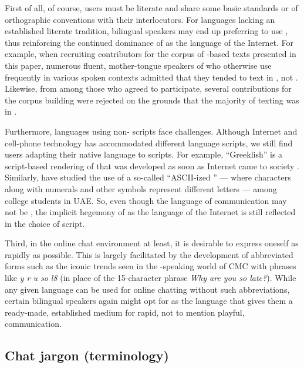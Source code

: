 \documentclass[output=paper
,newtxmath
,modfonts
,nonflat]{langsci/langscibook}
\begin{document}
First of all, of course, users must be literate and share some basic standards or  of orthographic conventions with their interlocutors. For languages lacking an established literate tradition, bilingual speakers may end up preferring to use , thus reinforcing the continued dominance of  as the language of the Internet. For example, when recruiting contributors for the corpus of -based texts presented in this paper, numerous fluent, mother-tongue speakers of  who otherwise use  frequently in various spoken contexts admitted that they tended to text in , not . Likewise, from among those who agreed to participate, several contributions for the corpus building were rejected on the grounds that the majority of texting was in . 

Furthermore, languages using non- scripts face challenges. Although Internet and cell-phone technology has accommodated different language scripts, we still find users adapting their native language to  scripts. For example, “Greeklish” is a  script-based rendering of  that was developed as soon as Internet came to  society \citep{androutsopoulos2012}. Similarly, \citet{palfreyman2007} have studied the use of a so-called “ASCII-ized ” — where  characters along with numerals and other symbols represent different  letters — among college students in UAE. So, even though the language of communication may not be , the implicit hegemony of  as the language of the Internet is still reflected in the choice of script. 

Third, in the online chat environment at least, it is desirable to express oneself as rapidly as possible. This is largely facilitated by the development of abbreviated forms such as the iconic trends seen in the -speaking world of CMC with phrases like \textit{y r u so l8} (in place of the 15-character phrase \textit{Why are you so late?}). While any given language can be used for online chatting without such abbreviations, certain bilingual speakers again might opt for  as the language that gives them a ready-made, established medium for rapid, not to mention playful, communication. 

\subsection{Chat jargon (terminology)}
\end{document}

